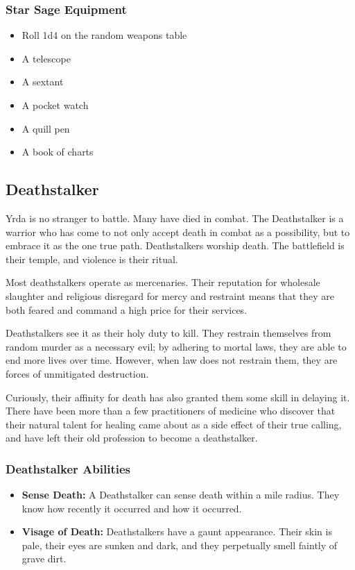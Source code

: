 \begin{multicols}{2}
\subsubsection{Star Sage Equipment}

\begin{itemize}
  \item Roll 1d4 on the random weapons table
  \item A telescope
  \item A sextant
  \item A pocket watch
  \item A quill pen
  \item A book of charts
\end{itemize}

\subsection{Deathstalker}

Yrda is no stranger to battle. Many have died in combat. The Deathstalker
is a warrior who has come to not only accept death in combat as a possibility,
but to embrace it as the one true path. Deathstalkers worship death. The
battlefield is their temple, and violence is their ritual.

Most deathstalkers operate as mercenaries. Their reputation for wholesale
slaughter and religious disregard for mercy and restraint means that they
are both feared and command a high price for their services.

Deathstalkers see it as their holy duty to kill. They restrain themselves
from random murder as a necessary evil; by adhering to mortal laws, they
are able to end more lives over time. However, when law does not restrain
them, they are forces of unmitigated destruction.

Curiously, their affinity for death has also granted them some skill in
delaying it. There have been more than a few practitioners of medicine
who discover that their natural talent for healing came about as a side
effect of their true calling, and have left their old profession to become
a deathstalker.

\subsubsection{Deathstalker Abilities}

\begin{itemize}
  \item \textbf{Sense Death:} A Deathstalker can sense death within a
    mile radius. They know how recently it occurred and how it occurred.
  \item \textbf{Visage of Death:} Deathstalkers have a gaunt appearance.
    Their skin is pale, their eyes are sunken and dark, and they perpetually
    smell faintly of grave dirt.
\end{itemize}


\end{multicols}
